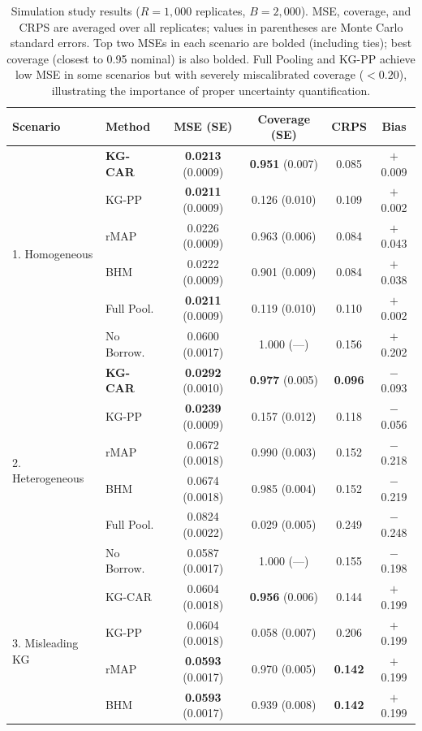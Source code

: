 \documentclass[12pt]{article}
\begin{document}
\begin{table}[ht]
\centering
\caption{Simulation study results ($R = 1{,}000$ replicates, $B = 2{,}000$). MSE, coverage, and CRPS are averaged over all replicates; values in parentheses are Monte Carlo standard errors. Top two MSEs in each scenario are bolded (including ties); best coverage (closest to 0.95 nominal) is also bolded. Full Pooling and KG-PP achieve low MSE in some scenarios but with severely miscalibrated coverage ($< 0.20$), illustrating the importance of proper uncertainty quantification.}
\label{tab:simulation}
\small
\begin{tabular}{llcccc}
\toprule
Scenario & Method & MSE (SE) & Coverage (SE) & CRPS & Bias \\
\midrule
\multirow{6}{*}{1. Homogeneous}
& \textbf{KG-CAR} & \textbf{0.0213} (0.0009) & \textbf{0.951} (0.007) & 0.085 & $+$0.009 \\
& KG-PP & \textbf{0.0211} (0.0009) & 0.126 (0.010) & 0.109 & $+$0.002 \\
& rMAP & 0.0226 (0.0009) & 0.963 (0.006) & 0.084 & $+$0.043 \\
& BHM & 0.0222 (0.0009) & 0.901 (0.009) & 0.084 & $+$0.038 \\
& Full Pool. & \textbf{0.0211} (0.0009) & 0.119 (0.010) & 0.110 & $+$0.002 \\
& No Borrow. & 0.0600 (0.0017) & 1.000 (---) & 0.156 & $+$0.202 \\
\midrule
\multirow{6}{*}{2. Heterogeneous}
& \textbf{KG-CAR} & \textbf{0.0292} (0.0010) & \textbf{0.977} (0.005) & \textbf{0.096} & $-$0.093 \\
& KG-PP & \textbf{0.0239} (0.0009) & 0.157 (0.012) & 0.118 & $-$0.056 \\
& rMAP & 0.0672 (0.0018) & 0.990 (0.003) & 0.152 & $-$0.218 \\
& BHM & 0.0674 (0.0018) & 0.985 (0.004) & 0.152 & $-$0.219 \\
& Full Pool. & 0.0824 (0.0022) & 0.029 (0.005) & 0.249 & $-$0.248 \\
& No Borrow. & 0.0587 (0.0017) & 1.000 (---) & 0.155 & $-$0.198 \\
\midrule
\multirow{6}{*}{3. Misleading KG}
& KG-CAR & 0.0604 (0.0018) & \textbf{0.956} (0.006) & 0.144 & $+$0.199 \\
& KG-PP & 0.0604 (0.0018) & 0.058 (0.007) & 0.206 & $+$0.199 \\
& rMAP & \textbf{0.0593} (0.0017) & 0.970 (0.005) & \textbf{0.142} & $+$0.199 \\
& BHM & \textbf{0.0593} (0.0017) & 0.939 (0.008) & \textbf{0.142} & $+$0.199 \\

\end{tabular}
\end{table}
\end{document}
